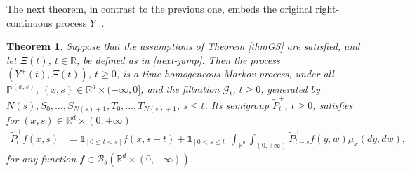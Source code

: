 \documentclass[reqno]{amsart}
\newtheorem{theorem}{Theorem}[section] %
\theoremstyle{remark}
\numberwithin{equation}{section} %
\newcommand{\RR}{\mathbb{R}}
\newcommand{\PP}{\mathds{P}}
\newcommand{\wt}{\widetilde}
\newcommand{\1}{\mathds{1}}
\begin{document}
	The next theorem, in contrast to the previous one, embeds the original right-continuous process $Y^+$.
	\begin{theorem}
		\label{thmGS+1}
		Suppose that the assumptions of Theorem \ref{thmGS} are satisfied, and let $\Xi(t)$, $t\in \RR$, be defined as in \eqref{next-jump}. Then the process $(Y^+(t), \Xi(t))$, $t \geq 0$, is a time-homogeneous Markov process, under all $\PP^{(x,s)}$, $(x,s)\in \RR^d\times (-\infty,0]$, and the filtration $\mathcal{G}_t$, $t \geq0$, generated by $N(s), S_0, \dots, {S_{N(s)+1}}, T_0, \dots, {T_{N(s)+1}}$, $s \leq t$. Its semigroup $\wt P_t^+$, $t \geq 0$, satisfies for $(x,s)\in \RR^d\times (0,+\infty)$
		\begin{align}\label{710-a}
			\wt P^+_tf(x,s)&=\mathds{1}_{[0\le t<s]}f(x,s-t)+\mathds{1}_{[0<s\le t ]}\int_{\RR^d}\int_{(0,+\infty)}\wt P^+_{t-s}f(y,w)\mu_{x}(dy,dw),
		\end{align}
		for any function $f \in \mathcal{B}_b (\mathbb{R}^d \times (0, +\infty))$.
	\end{theorem}
\end{document}
